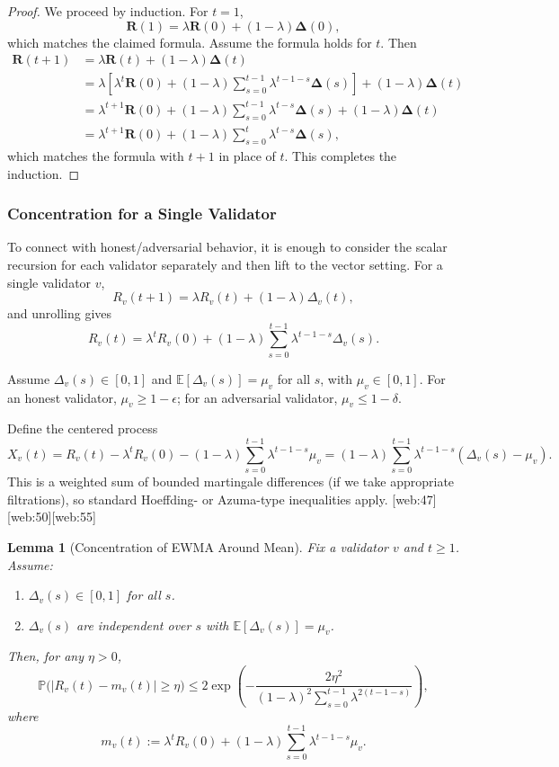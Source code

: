 \documentclass[11pt]{article}
\theoremstyle{plain}
\newtheorem{lemma}{Lemma}
\theoremstyle{definition}
\begin{document}
\begin{proof}
We proceed by induction. For \(t=1\),
\[
\bm{R}(1) = \lambda \bm{R}(0) + (1-\lambda)\bm{\Delta}(0),
\]
which matches the claimed formula. Assume the formula holds for \(t\). Then
\[
\begin{aligned}
\bm{R}(t+1)
&= \lambda \bm{R}(t) + (1-\lambda)\bm{\Delta}(t) \\
&= \lambda\left[\lambda^t \bm{R}(0) + (1-\lambda)\sum_{s=0}^{t-1} \lambda^{t-1-s} \bm{\Delta}(s)\right]
    + (1-\lambda)\bm{\Delta}(t) \\
&= \lambda^{t+1}\bm{R}(0)
  + (1-\lambda)\sum_{s=0}^{t-1} \lambda^{t-s} \bm{\Delta}(s)
  + (1-\lambda)\bm{\Delta}(t) \\
&= \lambda^{t+1}\bm{R}(0)
  + (1-\lambda)\sum_{s=0}^{t} \lambda^{t-s} \bm{\Delta}(s),
\end{aligned}
\]
which matches the formula with \(t+1\) in place of \(t\). This completes the induction.
\end{proof}

\subsubsection{Concentration for a Single Validator}

To connect with honest/adversarial behavior, it is enough to consider the scalar recursion for each validator separately and then lift to the vector setting. For a single validator \(v\),
\[
R_v(t+1) = \lambda R_v(t) + (1-\lambda)\Delta_v(t),
\]
and unrolling gives
\[
R_v(t) = \lambda^t R_v(0) + (1-\lambda)\sum_{s=0}^{t-1} \lambda^{t-1-s}\Delta_v(s).
\]

Assume \(\Delta_v(s) \in [0,1]\) and \(\mathbb{E}[\Delta_v(s)] = \mu_v\) for all \(s\), with \(\mu_v \in [0,1]\). For an honest validator,
\(\mu_v \ge 1-\epsilon\); for an adversarial validator, \(\mu_v \le 1-\delta\).

Define the centered process
\[
X_v(t)
= R_v(t) - \lambda^t R_v(0) - (1-\lambda)\sum_{s=0}^{t-1} \lambda^{t-1-s}\mu_v
= (1-\lambda)\sum_{s=0}^{t-1} \lambda^{t-1-s}(\Delta_v(s) - \mu_v).
\]
This is a weighted sum of bounded martingale differences (if we take appropriate filtrations), so standard Hoeffding- or Azuma-type inequalities apply. [web:47][web:50][web:55]

\begin{lemma}[Concentration of EWMA Around Mean]
\label{lem:ewma-concentration}
Fix a validator \(v\) and \(t \ge 1\). Assume:
\begin{enumerate}[leftmargin=*]
  \item \(\Delta_v(s) \in [0,1]\) for all \(s\).
  \item \(\Delta_v(s)\) are independent over \(s\) with \(\mathbb{E}[\Delta_v(s)] = \mu_v\).
\end{enumerate}
Then, for any \(\eta > 0\),
\[
\mathbb{P}\Big(|R_v(t) - m_v(t)| \ge \eta\Big)
\le 2\exp\left(-\frac{2\eta^2}{(1-\lambda)^2\sum_{s=0}^{t-1}\lambda^{2(t-1-s)}}\right),
\]
where
\[
m_v(t) := \lambda^t R_v(0) + (1-\lambda)\sum_{s=0}^{t-1} \lambda^{t-1-s}\mu_v.
\]
\end{lemma}
\end{document}
